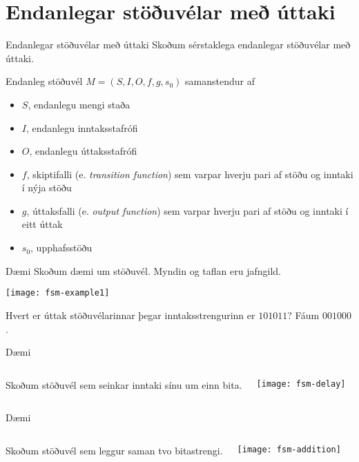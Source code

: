 \documentclass{beamer}
\begin{document}
\section{Endanlegar stöðuvélar með úttaki}

\begin{frame}{Endanlegar stöðuvélar með úttaki}
Skoðum sérstaklega endanlegar stöðuvélar með úttaki.

\begin{tcolorbox}
Endanleg stöðuvél $M = (S, I, O, f, g, s_0 )$ samanstendur af
\begin{itemize}
 \item $S$, endanlegu mengi staða
 \item $I$, endanlegu inntaksstafrófi
 \item $O$, endanlegu úttaksstafrófi
 \item $f$, skiptifalli (e. \emph{transition function}) sem varpar hverju pari af stöðu og inntaki í nýja stöðu
 \item $g$, úttaksfalli (e. \emph{output function}) sem varpar hverju pari af stöðu og inntaki í eitt úttak
 \item $s_0$, upphafsstöðu
\end{itemize}

\end{tcolorbox}
\end{frame}

\begin{frame}{Dæmi}
Skoðum dæmi um stöðuvél. Myndin og taflan eru jafngild.
\begin{center}
\texttt{[image: fsm-example1]}
\end{center}
Hvert er úttak stöðuvélarinnar þegar inntaksstrengurinn er $101011$? \pause Fáum $001000$.
\end{frame}

\begin{frame}{Dæmi}
\begin{columns}
Skoðum stöðuvél sem seinkar inntaki sínu um einn bita.

\texttt{[image: fsm-delay]}
\end{columns}

\end{frame}

\begin{frame}{Dæmi}
\begin{columns}
Skoðum stöðuvél sem leggur saman tvo bitastrengi. \pause

\texttt{[image: fsm-addition]}
\end{columns}
\end{frame}
\end{document}

